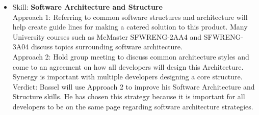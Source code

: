\documentclass[12pt]{article}
\begin{document}
\begin{itemize}
		\item Skill: \textbf{Software Architecture and Structure}
		\\ Approach 1: Referring to common software structures and architecture will help create guide lines for making a catered solution to this product. Many University courses such as McMaster SFWRENG-2AA4 and SFWRENG-3A04 discuss topics surrounding software architecture.
		\\ Approach 2: Hold group meeting to discuss common architecture styles and come to an agreement on how all developers will design this Architecture. Synergy is important with multiple developers designing a core structure.
		\\ Verdict: Bassel will use Approach 2 to improve his Software Architecture and Structure skills. He has chosen this strategy because it is important for all developers to be on the same page regarding software architecture strategies.
	\end{itemize}
	
\end{document}
